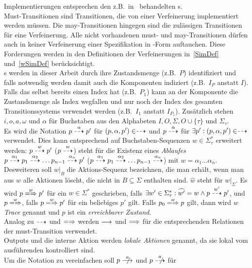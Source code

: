 Implementierungen entsprechen den z.B.\ in~\cite{Schinko2016BA} behandelten
\EIO{}s.\\
Must-Transitionen sind Transitionen, die von einer Verfeinerung implementiert
werden müssen. Die may-Transitionen hingegen sind die zulässigen Transitionen
für eine Verfeinerung. Alle nicht vorhandenen must- und may-Transitionen dürfen
auch in keiner Verfeinerung einer Spezifikation in \MEIO{}-Form auftauchen.
Diese Forderungen werden in den Definitionen der Verfeinerungen in~\ref{SimDef}
und~\ref{wSimDef} berücksichtigt.\\
\MEIO{}s  werden in dieser Arbeit durch ihre Zustandsmenge (z.B.\ $P$)
identifiziert und falls notwendig werden damit auch die Komponenten indiziert
(z.B.\ $I_P$ anstatt $I$). Falls das \MEIO{} selbst bereits einen Index hat
(z.B.\ $P_1$) kann an der Komponente die Zustandsmenge als Index wegfallen und
nur noch der Index des gesamten Transitionssystems verwendet werden (z.B.\
$I_1$ anstatt $I_{P_1}$). Zusätzlich stehen $i,o,a,\omega$ und $\alpha$ für
Buchstaben aus den Alphabeten $I,O,\Sigma ,O\cup\{\tau\}$ und $\Sigma_\tau$.\\
Es wird die Notation $p\may[\alpha] p'$ für $(p,\alpha,p')\in\may$ und
$p\may[\alpha]$ für $\exists p':(p,\alpha,p')\in\may$ verwendet. Dies kann
entsprechend auf Buchstaben-Sequenzen $w\in\Sigma_{\tau}^*$ erweitert werden:
$p\may[w]p'$ ($p\may[w]$) steht für die Existenz eines \emph{Ablaufes}
$p\may[\alpha _1]p_1\may[\alpha _2]\dots p_{n-1}\may[\alpha _n] p'$
($p\may[\alpha _1] p_1 \may[\alpha _2]\dots p_{n-1}\may[\alpha _n]$) mit
$w=\alpha _1\dots \alpha _n$.\\
Desweiteren soll $w|_B$ die Aktions-Sequenz bezeichnen, die man erhält, wenn
man aus $w$ alle Aktionen löscht, die nicht in $B\subseteq\Sigma$ enthalten
sind. $\widehat{w}$ steht für $w|_{\Sigma}$. Es wird $p\weakmay[w] p'$
für ein $w\in\Sigma ^*$ geschrieben, falls $\exists
w'\in\Sigma_{\tau}^*:\widehat{w'}=w\land p\may[w']p'$, und $p\weakmay[w]$,
falls $p\weakmay[w] p'$ für ein beliebiges $p'$ gilt. Falls $p_0\weakmay[w] p$
gilt, dann wird $w$ \emph{Trace} genannt und $p$ ist ein \emph{erreichbarer
Zustand}.\\
Analog zu $\may$ und $\weakmay$ werden $\must$ und $\weakmust$ für die
entsprechenden Relationen der must-Transition verwendet.\\
Outputs und die interne Aktion werden \emph{lokale Aktionen} genannt, da sie
lokal vom ausführenden \MEIO{} kontrolliert sind.\\
Um die Notation zu vereinfachen soll $p\nmust[a]$ und $p\nmay[a]$ für
